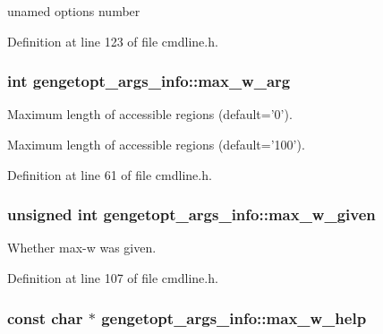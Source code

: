 unamed options number 



Definition at line 123 of file cmdline.\+h.

\hypertarget{structgengetopt__args__info_a9bc5ef56f828d6fb7ce0525884d6ed07}{
\subsubsection[{max\+\_\+w\+\_\+arg}]{\setlength{\rightskip}{0pt plus 5cm}int gengetopt\+\_\+args\+\_\+info\+::max\+\_\+w\+\_\+arg}}\label{structgengetopt__args__info_a9bc5ef56f828d6fb7ce0525884d6ed07}


Maximum length of accessible regions (default='0'). 

Maximum length of accessible regions (default='100'). 

Definition at line 61 of file cmdline.\+h.

\hypertarget{structgengetopt__args__info_aa982c2dc155c088dfd006708ce04c5ed}{
\subsubsection[{max\+\_\+w\+\_\+given}]{\setlength{\rightskip}{0pt plus 5cm}unsigned int gengetopt\+\_\+args\+\_\+info\+::max\+\_\+w\+\_\+given}}\label{structgengetopt__args__info_aa982c2dc155c088dfd006708ce04c5ed}


Whether max-\/w was given. 



Definition at line 107 of file cmdline.\+h.

\hypertarget{structgengetopt__args__info_a84421172a52bd1de77c3a500fddb731b}{
\subsubsection[{max\+\_\+w\+\_\+help}]{\setlength{\rightskip}{0pt plus 5cm}const char $\ast$ gengetopt\+\_\+args\+\_\+info\+::max\+\_\+w\+\_\+help}}\label{structgengetopt__args__info_a84421172a52bd1de77c3a500fddb731b}


